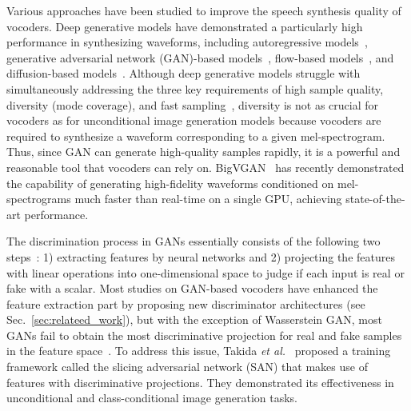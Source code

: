 \documentclass{article}
\begin{document}
Various approaches have been studied to improve the speech synthesis quality of vocoders. Deep generative models have demonstrated a particularly high performance in synthesizing waveforms, including autoregressive models~\cite{oord2016wavenet,kalchbrenner2018efficient}, generative adversarial network (GAN)-based models~\cite{kumar2019melgan,yamamoto2020parallel,kong2020hifigan}, flow-based models~\cite{oord2018parallel,ping2018clarinet,prenger2018waveglow,kim2019flowavenet,ping2020waveflow,lee2020nanoflow}, and diffusion-based models~\cite{chen2021wavegrad,kong2021diffwave,lee2022priorgrad,koizumi2022specgrad,takahashi2023hierarchical}.
Although deep generative models struggle with simultaneously addressing the three key requirements of high sample quality, diversity (mode coverage), and fast sampling~\cite{xiao2022tackling}, diversity is not as crucial for vocoders as for unconditional image generation models because vocoders are required to synthesize a waveform corresponding to a given mel-spectrogram. 
Thus, since GAN can generate high-quality samples rapidly, it is a powerful and reasonable tool that vocoders can rely on. BigVGAN~\cite{lee2023bigvgan} has recently demonstrated the capability of generating high-fidelity waveforms conditioned on mel-spectrograms much faster than real-time on a single GPU, achieving state-of-the-art performance.

The discrimination process in GANs essentially consists of the following two steps~\cite{takida2023san}: 1) extracting features by neural networks and 2) projecting the features with linear operations into one-dimensional space to judge if each input is real or fake with a scalar. Most studies on GAN-based vocoders have enhanced the feature extraction part by proposing new discriminator architectures (see Sec.~\ref{sec:relateed_work}), but with the exception of Wasserstein GAN, most GANs fail to obtain the most discriminative projection for real and fake samples in the feature space~\cite{takida2023san}. To address this issue, Takida \textit{et al.}~\cite{takida2023san} proposed a training framework called the slicing adversarial network (SAN) that makes use of features with discriminative projections. They demonstrated its effectiveness in unconditional and class-conditional image generation tasks.
\end{document}
